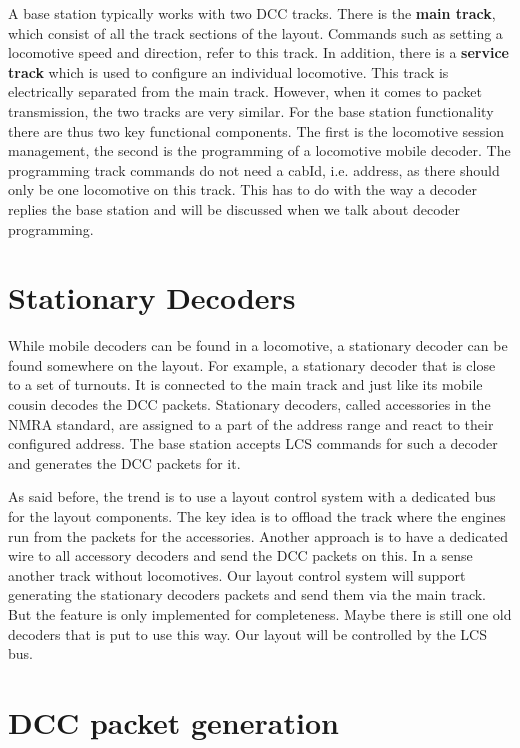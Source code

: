 A base station typically works with two DCC tracks. There is the \textbf{main track}, which consist of all the track sections of the layout. Commands such as setting a locomotive speed and direction, refer to this track. In addition, there is a \textbf{service track} which is used to configure an individual locomotive. This track is electrically separated from the main track. However, when it comes to packet transmission, the two tracks are very similar. For the base station functionality there are thus two key functional components. The first is the locomotive session management, the second is the programming of a locomotive mobile decoder. The programming track commands do not need a cabId, i.e. address, as there should only be one locomotive on this track. This has to do with the way a decoder replies the base station and will be discussed when we talk about decoder programming.

\section{Stationary Decoders}

While mobile decoders can be found in a locomotive, a stationary decoder can be found somewhere on the layout. For example, a stationary decoder that is close to a set of turnouts. It is connected to the main track and just like its mobile cousin decodes the DCC packets. Stationary decoders, called accessories in the NMRA standard, are assigned to a part of the address range and react to their configured address. The base station accepts LCS commands for such a decoder and generates the DCC packets for it.

As said before, the trend is to use a layout control system with a dedicated bus for the layout components. The key idea is to offload the track where the engines run from the packets for the accessories. Another approach is to have a dedicated wire to all accessory decoders and send the DCC packets on this. In a sense another track without locomotives. Our layout control system will support generating the stationary decoders packets and send them via the main track.  But the feature is only implemented for completeness. Maybe there is still one old decoders that is put to use this way. Our layout will be controlled by the LCS bus.

\section{DCC packet generation}

